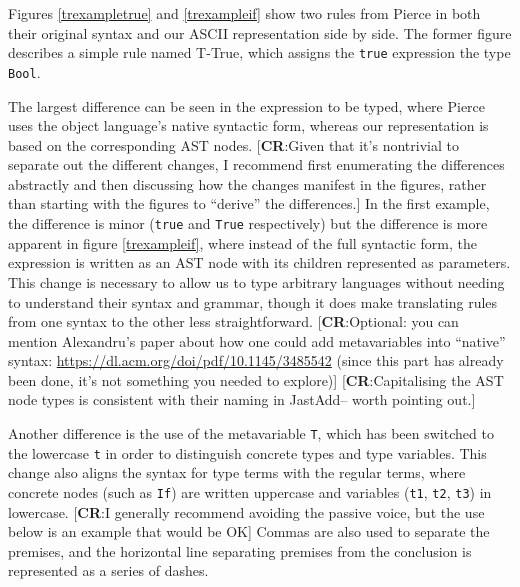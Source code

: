\documentclass[nofilelist]{cslthse-msc}
\newcommand{\CR}[1]{\textcolor{green!60!black}{[\textbf{CR}:#1]}}
\begin{document}
Figures \ref{trexampletrue} and \ref{trexampleif} show two rules from Pierce in both their original syntax and our ASCII representation side by side.
The former figure describes a simple rule named T-True, which assigns the \verb|true| expression the type \verb|Bool|.

The largest difference can be seen in the expression to be typed, where Pierce uses the object language's native syntactic form, whereas our representation is based on the corresponding AST nodes.
\CR{Given that it's nontrivial to separate out the different changes, I recommend first enumerating the differences abstractly and then discussing how the changes manifest in the figures, rather than starting with the figures to ``derive'' the differences.}
In the first example, the difference is minor (\verb|true| and \verb|True| respectively) but the difference is more apparent in figure \ref{trexampleif}, where instead of the full syntactic form, the expression is written as an AST node with its children represented as parameters.
This change is necessary to allow us to type arbitrary languages without needing to understand their syntax and grammar, though it does make translating rules from one syntax to the other less straightforward.
\CR{Optional: you can mention Alexandru's paper about how one could add metavariables into ``native'' syntax: \url{https://dl.acm.org/doi/pdf/10.1145/3485542}
  (since this part has already been done, it's not something you needed to explore)}
\CR{Capitalising the AST node types is consistent with their naming in JastAdd-- worth pointing out.}

Another difference is the use of the metavariable \verb|T|, which has been switched to the lowercase \verb|t| in order to distinguish concrete types and type variables.
This change also aligns the syntax for type terms with the regular terms, where concrete nodes (such as \verb|If|) are written uppercase and variables (\verb|t1|, \verb|t2|, \verb|t3|) in lowercase.
\CR{I generally recommend avoiding the passive voice, but the use below is an example that would be OK}
Commas are also used to separate the premises, and the horizontal line separating premises from the conclusion is represented as a series of dashes.
\end{document}
